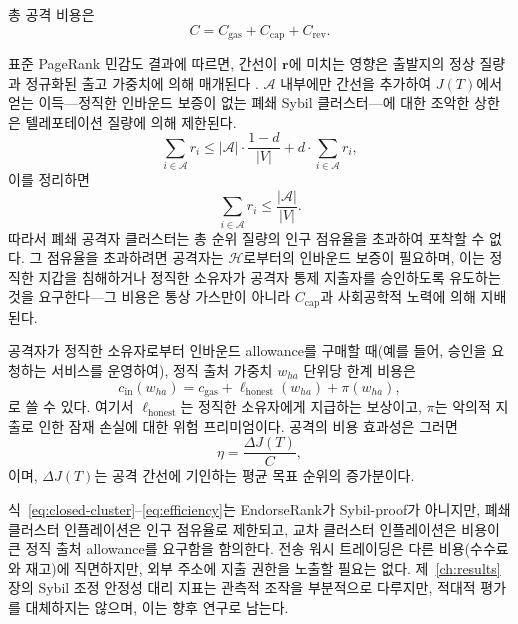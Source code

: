 총 공격 비용은
\begin{equation}
\label{eq:total-cost}
C = C_{\mathrm{gas}} + C_{\mathrm{cap}} + C_{\mathrm{rev}}.
\end{equation}


표준 PageRank 민감도 결과에 따르면, 간선이 $\mathbf{r}$에 미치는 영향은 출발지의 정상 질량과 정규화된 출고 가중치에 의해 매개된다 . $\mathcal{A}$ 내부에만 간선을 추가하여 $J(T)$에서 얻는 이득---정직한 인바운드 보증이 없는 폐쇄 Sybil 클러스터---에 대한 조악한 상한은 텔레포테이션 질량에 의해 제한된다.
\begin{equation}
\label{eq:closed-cluster}
\sum_{i\in\mathcal{A}} r_i \leq |\mathcal{A}|\cdot\frac{1-d}{|V|} + d\cdot \sum_{i\in\mathcal{A}} r_i,
\end{equation}
이를 정리하면
\begin{equation}
\label{eq:cluster-mass}
\sum_{i\in\mathcal{A}} r_i \leq \frac{|\mathcal{A}|}{|V|}.
\end{equation}
따라서 폐쇄 공격자 클러스터는 총 순위 질량의 인구 점유율을 초과하여 포착할 수 없다. 그 점유율을 초과하려면 공격자는 $\mathcal{H}$로부터의 인바운드 보증이 필요하며, 이는 정직한 지갑을 침해하거나 정직한 소유자가 공격자 통제 지출자를 승인하도록 유도하는 것을 요구한다---그 비용은 통상 가스만이 아니라 $C_{\mathrm{cap}}$과 사회공학적 노력에 의해 지배된다.

공격자가 정직한 소유자로부터 인바운드 allowance를 구매할 때(예를 들어, 승인을 요청하는 서비스를 운영하여), 정직 출처 가중치 $w_{h a}$ 단위당 한계 비용은
\begin{equation}
\label{eq:marginal}
c_{\mathrm{in}}(w_{h a}) = c_{\mathrm{gas}} + \ell_{\mathrm{honest}}(w_{h a}) + \pi(w_{h a}),
\end{equation}
로 쓸 수 있다. 여기서 $\ell_{\mathrm{honest}}$는 정직한 소유자에게 지급하는 보상이고, $\pi$는 악의적 지출로 인한 잠재 손실에 대한 위험 프리미엄이다. 공격의 비용 효과성은 그러면
\begin{equation}
\label{eq:efficiency}
\eta = \frac{\Delta J(T)}{C},
\end{equation}
이며, $\Delta J(T)$는 공격 간선에 기인하는 평균 목표 순위의 증가분이다.

식~\eqref{eq:closed-cluster}--\eqref{eq:efficiency}는 EndorseRank가 Sybil-proof가 아니지만, 폐쇄 클러스터 인플레이션은 인구 점유율로 제한되고, 교차 클러스터 인플레이션은 비용이 큰 정직 출처 allowance를 요구함을 함의한다. 전송 워시 트레이딩은 다른 비용(수수료와 재고)에 직면하지만, 외부 주소에 지출 권한을 노출할 필요는 없다. 제~\ref{ch:results}장의 Sybil 조정 안정성 대리 지표는 관측적 조작을 부분적으로 다루지만, 적대적 평가를 대체하지는 않으며, 이는 향후 연구로 남는다.


